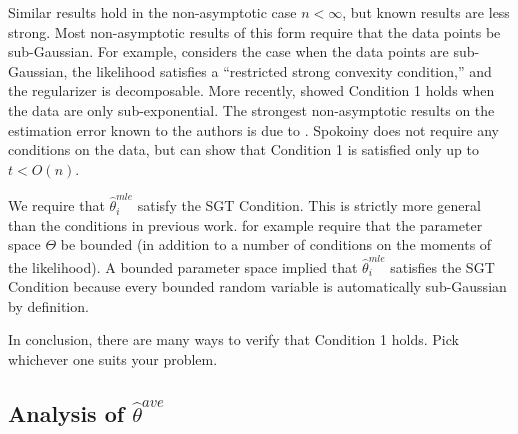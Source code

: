 \documentclass[twoside]{article}
\newcommand{\zero}{\text{\textbf{0}}}
\newcommand{\E}{\mathbb{E}}
\newcommand{\w}{\theta}
\newcommand{\wave}{\hat\w^{ave}}
\newcommand{\wmle}{\hat\w^{mle}}
\newcommand{\I}{\mathcal I}
\newcommand{\normal}[2]{\ensuremath{\mathcal{N}\left({{#1}},{{#2}}\right)}}
\begin{document}
Similar results hold in the non-asymptotic case $n<\infty$,
but known results are less strong.
Most non-asymptotic results of this form require that the data points be sub-Gaussian.
For example, \cite{negahban2009unified} considers the case when the data points are sub-Gaussian, the likelihood satisfies a ``restricted strong convexity condition,'' and the regularizer is decomposable.
More recently, \cite{sivakumar2015beyond} showed Condition 1 holds when the data are only sub-exponential.
The strongest non-asymptotic results on the estimation error known to the authors is due to \cite{spokoiny2012parametricestimation}.
Spokoiny does not require any conditions on the data,
but can show that Condition 1 is satisfied only up to $t < O(n)$.

We require that $\wmle_i$ satisfy the SGT Condition.
This is strictly more general than the conditions in previous work.
\cite{zhang2012communication} for example require that the parameter space $\Theta$ be bounded (in addition to a number of conditions on the moments of the likelihood).
A bounded parameter space implied that $\wmle_i$ satisfies the SGT Condition because every bounded random variable is automatically sub-Gaussian by definition.

In conclusion,
there are many ways to verify that Condition 1 holds.
Pick whichever one suits your problem.

\subsection{Analysis of $\wave$}

\end{document}
